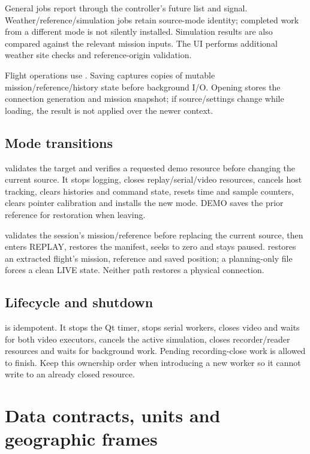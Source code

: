 General jobs report through the controller's future list and 
signal. Weather/reference/simulation jobs retain source-mode identity; completed
work from a different mode is not silently installed. Simulation results are
also compared against the relevant mission inputs. The UI performs additional
weather site checks and reference-origin validation.

Flight operations use . Saving captures copies of mutable
mission/reference/history state before background I/O. Opening stores the
connection generation and mission snapshot; if source/settings change while
loading, the result is not applied over the newer context.

\subsection{Mode transitions}
 validates the target and verifies a requested demo resource
before changing the current source. It stops logging, closes replay/serial/video
resources, cancels host tracking, clears histories and command state, resets time
and sample counters, clears pointer calibration and installs the new mode.
DEMO saves the prior reference for restoration when leaving.



 validates the session's mission/reference before replacing
the current source, then enters REPLAY, restores the manifest, seeks to zero and
stays paused.  restores an extracted flight's mission,
reference and saved position; a planning-only file forces a clean LIVE state.
Neither path restores a physical connection.

\subsection{Lifecycle and shutdown}
 is idempotent. It stops the Qt timer, stops serial
workers, closes video and waits for both video executors, cancels the active
simulation, closes recorder/reader resources and waits for background work.
Pending recording-close work is allowed to finish. Keep this ownership order
when introducing a new worker so it cannot write to an already closed resource.

\section{Data contracts, units and geographic frames}\label{sec:data}
